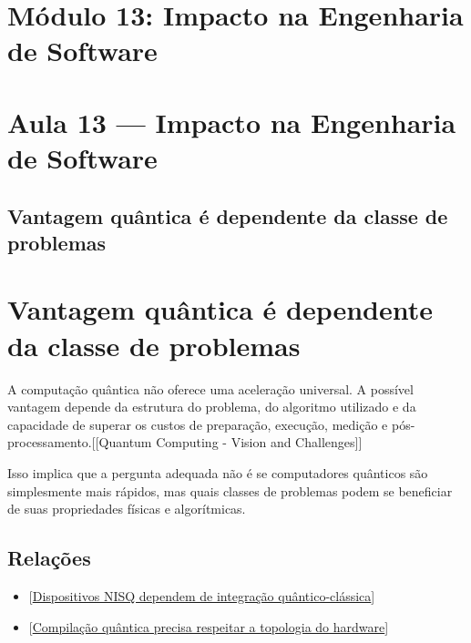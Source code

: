 \documentclass[
  brazilian,
]{report}
\providecommand{\tightlist}{%
  \setlength{\itemsep}{0pt}\setlength{\parskip}{0pt}}
\begin{document}
\newpage

\chapter{Módulo 13: Impacto na Engenharia de
Software}\label{muxf3dulo-13-impacto-na-engenharia-de-software}

\chapter{Aula 13 --- Impacto na Engenharia de
Software}\label{aula-13-impacto-na-engenharia-de-software}

\section{Vantagem quântica é dependente da classe de
problemas}\label{vantagem-quuxe2ntica-uxe9-dependente-da-classe-de-problemas}

\chapter{Vantagem quântica é dependente da classe de
problemas}\label{vantagem-quuxe2ntica-uxe9-dependente-da-classe-de-problemas-1}

A computação quântica não oferece uma aceleração universal. A possível
vantagem depende da estrutura do problema, do algoritmo utilizado e da
capacidade de superar os custos de preparação, execução, medição e
pós-processamento.{[}{[}Quantum Computing - Vision and Challenges{]}{]}

Isso implica que a pergunta adequada não é se computadores quânticos são
simplesmente mais rápidos, mas quais classes de problemas podem se
beneficiar de suas propriedades físicas e algorítmicas.

\section{Relações}\label{relauxe7uxf5es-2}

\begin{itemize}
\tightlist
\item
  {[}\hyperref[dispositivos-nisq-dependem-de-integrauxe7uxe3o-quuxe2ntico-cluxe1ssica]{Dispositivos
  NISQ dependem de integração quântico-clássica}{]}
\item
  {[}\hyperref[compilauxe7uxe3o-quuxe2ntica-precisa-respeitar-a-topologia-do-hardware]{Compilação
  quântica precisa respeitar a topologia do hardware}{]}
\end{itemize}
\end{document}
